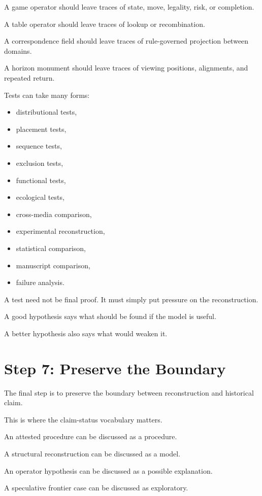 \documentclass[11pt]{book}
\begin{document}
A game operator should leave traces of state, move, legality, risk, or completion.

A table operator should leave traces of lookup or recombination.

A correspondence field should leave traces of rule-governed projection between domains.

A horizon monument should leave traces of viewing positions, alignments, and repeated return.

Tests can take many forms:

\begin{itemize}
    \item distributional tests,
    \item placement tests,
    \item sequence tests,
    \item exclusion tests,
    \item functional tests,
    \item ecological tests,
    \item cross-media comparison,
    \item experimental reconstruction,
    \item statistical comparison,
    \item manuscript comparison,
    \item failure analysis.
\end{itemize}

A test need not be final proof. It must simply put pressure on the reconstruction.

A good hypothesis says what should be found if the model is useful.

A better hypothesis also says what would weaken it.

\section{Step 7: Preserve the Boundary}

The final step is to preserve the boundary between reconstruction and historical claim.

This is where the claim-status vocabulary matters.

An attested procedure can be discussed as a procedure.

A structural reconstruction can be discussed as a model.

An operator hypothesis can be discussed as a possible explanation.

A speculative frontier case can be discussed as exploratory.
\end{document}
